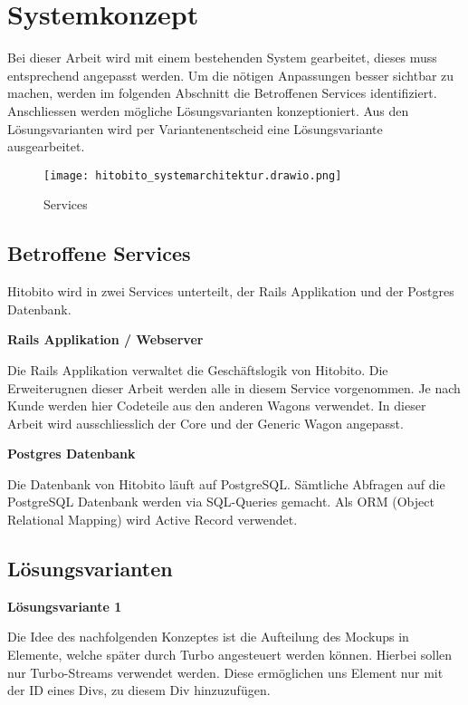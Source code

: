 \newpage

\section{Systemkonzept}
Bei dieser Arbeit wird mit einem bestehenden System gearbeitet, dieses muss entsprechend angepasst werden. 
Um die nötigen Anpassungen besser sichtbar zu machen, werden im folgenden Abschnitt die Betroffenen Services identifiziert.
Anschliessen werden mögliche Lösungsvarianten konzeptioniert. Aus den Lösungsvarianten wird per Variantenentscheid eine Lösungsvariante ausgearbeitet.

\begin{figure}[h]
   \centering
   \texttt{[image: hitobito\_systemarchitektur.drawio.png]}
   \caption{Services}
\end{figure}

\subsection{Betroffene Services}
Hitobito wird in zwei Services unterteilt, der Rails Applikation und der Postgres Datenbank.

\textbf{Rails Applikation / Webserver}

Die Rails Applikation verwaltet die Geschäftslogik von Hitobito. Die Erweiterugnen dieser Arbeit
werden alle in diesem Service vorgenommen. Je nach Kunde werden hier Codeteile aus den anderen Wagons verwendet.
In dieser Arbeit wird ausschliesslich der Core und der Generic Wagon angepasst.

\textbf{Postgres Datenbank}

Die Datenbank von Hitobito läuft auf PostgreSQL. Sämtliche Abfragen auf die PostgreSQL Datenbank werden via SQL-Queries
gemacht. Als ORM (Object Relational Mapping) wird Active Record verwendet.

\newpage

\subsection{Lösungsvarianten}

\textbf{Lösungsvariante 1}

Die Idee des nachfolgenden Konzeptes ist die Aufteilung des Mockups in Elemente, welche später durch 
Turbo angesteuert werden können. Hierbei sollen nur Turbo-Streams verwendet werden. Diese ermöglichen uns Element nur mit der ID 
eines Divs, zu diesem Div hinzuzufügen.  

